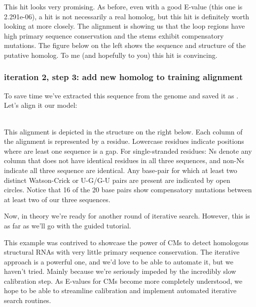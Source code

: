 This hit looks very promising. As before, even with a good E-value
(this one is 2.291e-06), a hit is not necessarily a real homolog, but
this hit is definitely worth looking at more closely. The
 alignment is showing us that the loop regions have
high primary sequence conservation and the stems exhibit
compensatory mutations. The figure below on the left shows the
sequence and structure of the putative homolog. To me (and hopefully to you) this
hit is convincing. 

\subsubsection{iteration 2, step 3: add new homolog to training alignment}
To save time we've extracted this sequence from the genome and saved
it as . Let's align it our model:

\\

This alignment is depicted in the structure on the right below. Each
column of the alignment is represented by a residue. Lowercase
residues indicate positions where are least one sequence is a gap.
For single-stranded residues: Ns denote any column that does not have
identical residues in all three sequences, and non-Ns indicate all
three sequence are identical. Any base-pair for which at least two
distinct Watson-Crick or U-G/G-U pairs are present are indicated by
open circles. Notice that 16 of the 20 base pairs show compensatory
mutations between at least two of our three sequences.

Now, in theory we're ready for another round of iterative search. However, this
is as far as we'll go with the guided tutorial. 

This example was contrived to showcase the power of CMs to detect
homologous structural RNAs with very little primary sequence
conservation. The iterative approach is a powerful one, and we'd love
to be able to automate it, but we haven't tried. Mainly because we're
seriously impeded by the incredibly slow calibration step. As E-values
for CMs become more completely understood, we hope to be able to
streamline calibration and implement automated iterative search
routines. 


